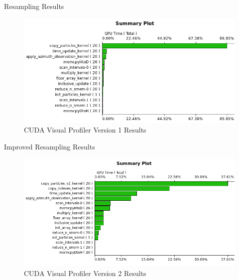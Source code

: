 \documentclass{beamer}
\begin{document}

\begin{frame}{Resampling Results}

\begin{figure}
\centering
\includegraphics[width=1.0\textwidth]{data/profile_cuda_version1_pic1.png}
\caption{CUDA Visual Profiler Version 1 Results}
\end{figure}

\end{frame}


\begin{frame}{Improved Resampling Results}

\begin{figure}
\centering
\includegraphics[width=1.0\textwidth]{data/profile_cuda_version2_pic1.png}
\caption{CUDA Visual Profiler Version 2 Results}
\end{figure}

\end{frame}

\end{document}
